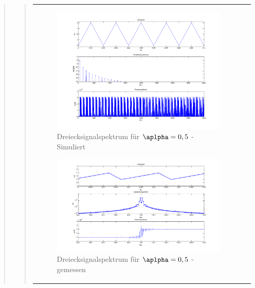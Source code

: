 \begin{quote}
\begin{quote}
\begin{center}
\begin{tabular}{ll}
\begin{minipage}{0.6\textwidth}
                    \begin{figure}[H]
                        \label{fig:}            
                        \includegraphics[scale=0.25]{./Bilder/drei_alpha5.png} %
                        \caption{Dreiecksignalspektrum für $\aplpha = 0,5$ - Simuliert}
                    \end{figure}

                \end{minipage}
                \begin{minipage}{0.6\textwidth}

                    \begin{figure}[H]
                        \label{fig:}            
                        \includegraphics[scale=0.3]{./Bilder/drei_alpha5_-_gemessen.png} %
                        \caption{Dreiecksignalspektrum für $\aplpha = 0,5$ - gemessen}
                    \end{figure}                
               \vspace{-1.5em}


\end{minipage}
\end{tabular}
\end{center}
\end{quote}
\end{quote}
